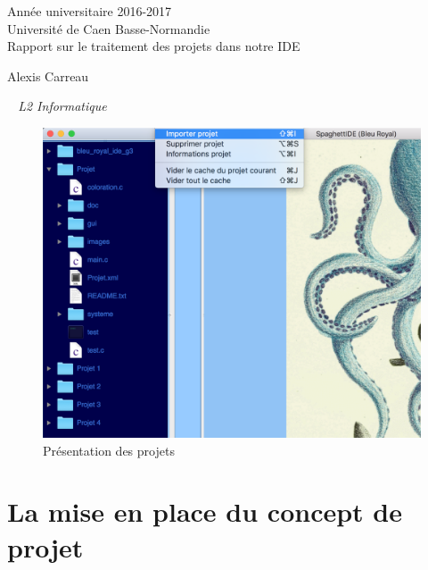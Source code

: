 \documentclass[a4paper,12pt]{article}
\begin{document}
\begin{titlepage}
	\begin{center}
		\Large{Année universitaire 2016-2017}\\
		\Large{Université de Caen Basse-Normandie}\\[1cm]
		
		\huge{Rapport sur le traitement des projets dans notre IDE}\\
		\vspace{3cm}
		
		Alexis Carreau
		
	\normalsize{\textit{ ~ L2 Informatique}}\\
		\medskip
		\vspace{2cm}
		
	\begin{figure}[h!]
			\begin{center}
				\includegraphics[scale=0.6]{images/project.png}
				\caption{Présentation des projets}
			\end{center}
		\end{figure}
				
	\end{center}
\end{titlepage}

\tableofcontents
\newpage

\section{La mise en place du concept de projet}
\end{document}
